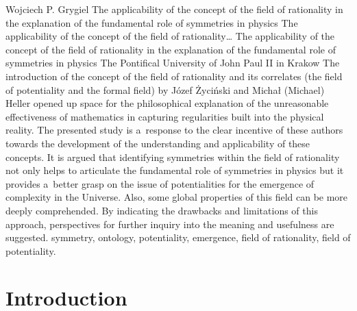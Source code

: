 \begin{artengenv}{Wojciech P. Grygiel}
	{The applicability of the concept of the field of rationality in the explanation of the fundamental role of symmetries in physics}
	{The applicability of the concept of the field of rationality\ldots}
	{The applicability of the concept of the field of rationality in the explanation of the fundamental role of symmetries in physics}
	{The Pontifical University of John Paul II in Krakow}
	{The introduction of the concept of the field of rationality and its correlates (the field of potentiality and the formal field) by Józef Życiński and Michał (Michael) Heller opened up space for the philosophical explanation of the unreasonable effectiveness of mathematics in capturing regularities built into the physical reality. The presented study is a~response to the clear incentive of these authors towards the development of the understanding and applicability of these concepts. It is argued that identifying symmetries within the field of rationality not only helps to articulate the fundamental role of symmetries in physics but it provides a~better grasp on the issue of potentialities for the emergence of complexity in the Universe. Also, some global properties of this field can be more deeply comprehended. By indicating the drawbacks and limitations of this approach, perspectives for further inquiry into the meaning and usefulness are suggested.
	}
	{symmetry, ontology, potentiality, emergence, field of rationality, field of potentiality.}




\section*{Introduction}


\end{artengenv}
